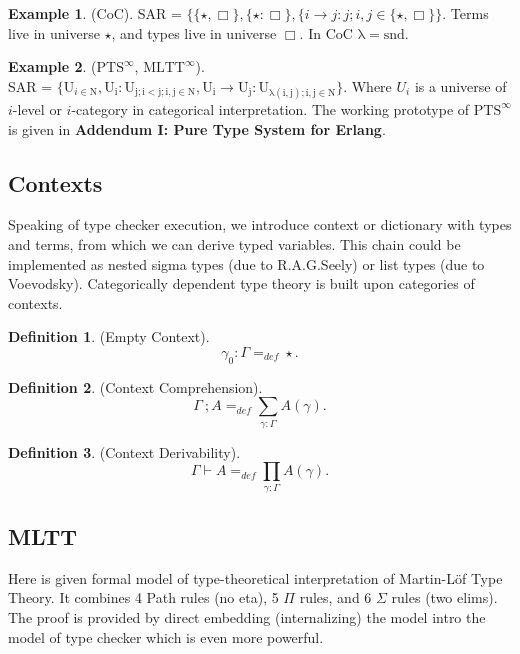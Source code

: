 \documentclass[twocolumn,10pt]{article}
\theoremstyle{definition}
\newtheorem{definition}{Definition}
\newtheorem{example}{Example}
\begin{document}
\begin{example} (CoC). SAR = $\{ \{\star , \Box \},\{ \star : \Box \},
        \{ i \rightarrow j : j; i, j \in \{ \star, \Box \}
        \}$. Terms live in universe $\star$, and types live in universe $\Box$. In CoC $\mathrm{\lambda=snd}$.
\end{example}

\begin{example} ($\mathrm{PTS}^\infty$, $\mathrm{MLTT}^\infty$).\\ SAR = $\{ \mathrm{U}_{i \in \mathrm{N}},
    \mathrm{U_i : U_{j; i < j; i,j \in N}},
    \mathrm{U_i} \rightarrow \mathrm{U_j} : \mathrm{U_{\lambda(i,j); i,j \in \mathrm{N}}}
    \}$. Where $U_i$ is a universe of $i$-level or $i$-category in categorical interpretation.
    The working prototype of $\mathrm{PTS}^\infty$ is given in
    {\bf Addendum I: Pure Type System for Erlang}\cite{Tonpa18}.
\end{example}

\subsection{Contexts}

Speaking of type checker execution, we introduce context or dictionary with types and terms,
from which we can derive typed variables. This chain could be implemented as
nested sigma types (due to R.A.G.Seely) or list types (due to Voevodsky). Categorically
dependent type theory is built upon categories of contexts.

\begin{definition} (Empty Context).
$$
    \gamma_0 : \Gamma =_{def} \star.
$$
\end{definition}

\begin{definition} (Context Comprehension).
$$
\Gamma\ ; A =_{def} \sum_{\gamma:\Gamma}A(\gamma).
$$
\end{definition}

\begin{definition} (Context Derivability).
$$
\Gamma \vdash A =_{def} \prod_{\gamma:\Gamma}A(\gamma).
$$
\end{definition}

\subsection{MLTT}

Here is given formal model of type-theoretical interpretation of Martin-Löf Type Theory.
It combines 4 Path rules (no eta), 5 $\Pi$ rules, and 6 $\Sigma$ rules (two elims).
The proof is provided by direct embedding (internalizing) the model intro the model
of type checker which is even more powerful.
\end{document}
